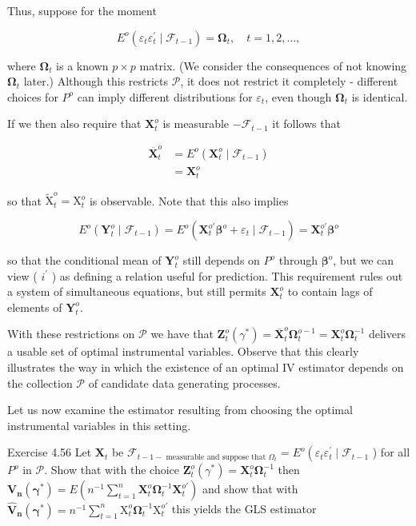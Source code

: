 \documentclass[10pt]{article}
\begin{document}
Thus, suppose for the moment

$$
E^{o}\left(\varepsilon_{t} \varepsilon_{t}^{\prime} \mid \mathcal{F}_{t-1}\right)=\boldsymbol{\Omega}_{t}, \quad t=1,2, \ldots,
$$

where $\boldsymbol{\Omega}_{t}$ is a known $p \times p$ matrix. (We consider the consequences of not knowing $\boldsymbol{\Omega}_{t}$ later.) Although this restricts $\mathcal{P}$, it does not restrict it completely - different choices for $P^{o}$ can imply different distributions for $\varepsilon_{t}$, even though $\boldsymbol{\Omega}_{t}$ is identical.

If we then also require that $\mathbf{X}_{t}^{o}$ is measurable $-\mathcal{F}_{t-1}$ it follows that

$$
\begin{aligned}
\overline{\mathbf{X}}_{t}^{o} & =E^{o}\left(\mathbf{X}_{t}^{o} \mid \mathcal{F}_{t-1}\right) \\
& =\mathbf{X}_{t}^{o}
\end{aligned}
$$

so that $\tilde{\mathrm{X}}_{t}^{o}=\mathrm{X}_{t}^{o}$ is observable. Note that this also implies

$$
E^{o}\left(\mathbf{Y}_{t}^{o} \mid \mathcal{F}_{t-1}\right)=E^{o}\left(\mathbf{X}_{t}^{o \prime} \boldsymbol{\beta}^{o}+\varepsilon_{t} \mid \mathcal{F}_{t-1}\right)=\mathbf{X}_{t}^{o \prime} \boldsymbol{\beta}^{o}
$$

so that the conditional mean of $\mathbf{Y}_{t}^{o}$ still depends on $P^{o}$ through $\boldsymbol{\beta}^{o}$, but we can view ( $i^{\prime}$ ) as defining a relation useful for prediction. This requirement rules out a system of simultaneous equations, but still permits $\mathbf{X}_{t}^{o}$ to contain lags of elements of $\mathbf{Y}_{t}^{o}$.

With these restrictions on $\mathcal{P}$ we have that $\mathbf{Z}_{t}^{o}\left(\gamma^{*}\right)=\overline{\mathbf{X}}_{t}^{o} \boldsymbol{\Omega}_{t}^{o-1}=\mathbf{X}_{t}^{o} \boldsymbol{\Omega}_{t}^{-1}$ delivers a usable set of optimal instrumental variables. Observe that this clearly illustrates the way in which the existence of an optimal IV estimator depends on the collection $\mathcal{P}$ of candidate data generating processes.

Let us now examine the estimator resulting from choosing the optimal instrumental variables in this setting.

Exercise 4.56 Let $\mathbf{X}_{t}$ be $\mathcal{F}_{t-1-\text { measurable and suppose that } \Omega_{t}}=E^{o}\left(\varepsilon_{t} \varepsilon_{t}^{\prime} \mid\right. \mathcal{F}_{t-1}$ ) for all $P^{o}$ in $\mathcal{P}$. Show that with the choice $\mathbf{Z}_{t}^{o}\left(\gamma^{*}\right)=\mathbf{X}_{t}^{o} \boldsymbol{\Omega}_{t}^{-1}$ then $\mathbf{V}_{\boldsymbol{n}}\left(\boldsymbol{\gamma}^{*}\right)=E\left(n^{-1} \sum_{t=1}^{n} \mathbf{X}_{t}^{o} \boldsymbol{\Omega}_{t}^{-1} \mathbf{X}_{t}^{o \prime}\right)$ and show that with $\hat{\mathbf{V}}_{\boldsymbol{n}}\left(\boldsymbol{\gamma}^{*}\right)=n^{-1} \sum_{t=1}^{n} \mathrm{X}_{t}^{o} \boldsymbol{\Omega}_{t}^{-1} \mathrm{X}_{t}^{o \prime}$ this yields the GLS estimator
\end{document}
